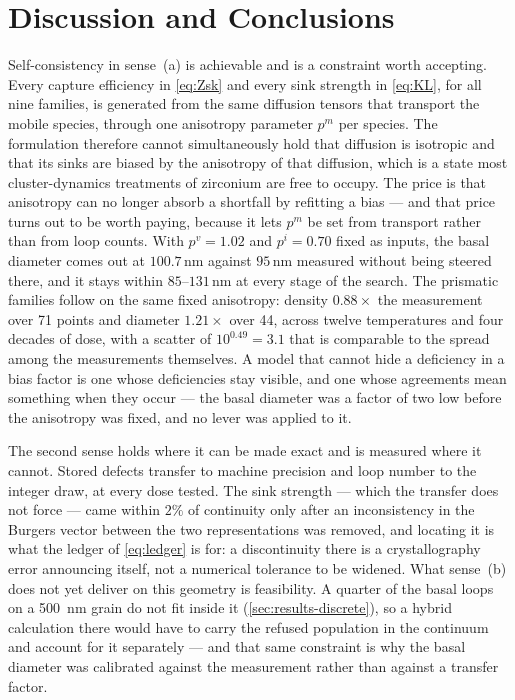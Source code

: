 \section{Discussion and Conclusions}\label{sec:conclusions}

Self-consistency in sense~(a) is achievable and is a constraint worth accepting.
Every capture efficiency in \cref{eq:Zsk} and every sink strength in
\cref{eq:KL}, for all nine families, is generated from the same diffusion
tensors that transport the mobile species, through one anisotropy parameter
$p^{m}$ per species. The formulation therefore cannot simultaneously hold that
diffusion is isotropic and that its sinks are biased by the anisotropy of that
diffusion, which is a state most cluster-dynamics treatments of zirconium are
free to occupy. The price is that anisotropy can no longer absorb a shortfall by
refitting a bias --- and that price turns out to be worth paying, because it
lets $p^{m}$ be set from transport rather than from loop counts. With
$p^{v}=1.02$ and $p^{i}=0.70$ fixed as inputs, the basal diameter comes out at
$100.7\,$nm against $95\,$nm measured without being steered there, and it stays
within $85$--$131\,$nm at every stage of the search. The prismatic families
follow on the same fixed anisotropy: density $0.88\times$ the measurement over
71 points and diameter $1.21\times$ over 44, across twelve temperatures and four
decades of dose, with a scatter of $10^{0.49}=3.1$ that is comparable to the
spread among the measurements themselves. A model that cannot hide a deficiency
in a bias factor is one whose deficiencies stay visible, and one whose
agreements mean something when they occur --- the basal diameter was a factor
of two low before the anisotropy was fixed, and no lever was applied to it.

The second sense holds where it can be made exact and is measured where it
cannot. Stored defects transfer to machine precision and loop number to the
integer draw, at every dose tested. The sink strength --- which the transfer does
not force --- came within $2\%$ of continuity only after an inconsistency in the
\cloop{} Burgers vector between the two representations was removed, and locating
it is what the ledger of \cref{eq:ledger} is for: a discontinuity there is a
crystallography error announcing itself, not a numerical tolerance to be widened.
What sense~(b) does not yet deliver on this geometry is feasibility. A quarter of
the basal loops on a \SI{500}{\nano\meter} grain do not fit inside it
(\cref{sec:results-discrete}), so a hybrid calculation there would have to carry
the refused population in the continuum and account for it separately --- and
that same constraint is why the basal diameter was calibrated against the
measurement rather than against a transfer factor.

